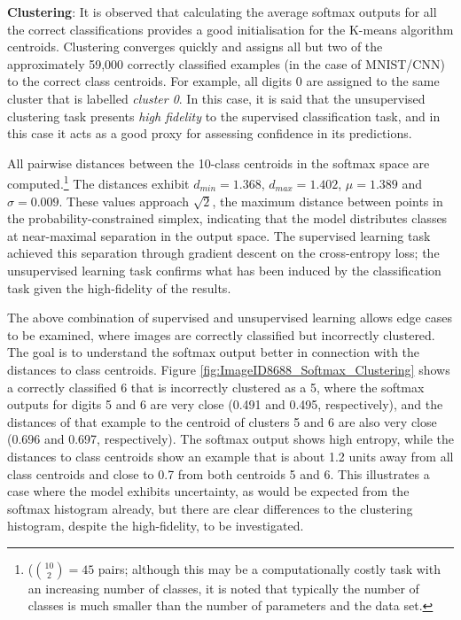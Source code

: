 \textbf{Clustering}: It is observed that calculating the average softmax outputs for all the correct classifications provides a good initialisation for the K-means algorithm centroids. Clustering converges quickly and assigns all but two of the approximately 59,000 correctly classified examples (in the case of MNIST/CNN) to the correct class centroids. For example, all digits 0 are assigned to the same cluster that is labelled \textit{cluster 0}. In this case, it is said that the unsupervised clustering task presents \emph{high fidelity} to the supervised classification task, and in this case it acts as a good proxy for assessing confidence in its predictions.%

All pairwise distances between the 10-class centroids in the softmax space are computed.\footnote{($\binom{10}{2}=45$ pairs; although this may be a computationally costly task with an increasing number of classes, it is noted that typically the number of classes is much smaller than the number of parameters and the data set.} The distances exhibit $d_{min}=1.368$, $d_{max}=1.402$, $\mu=1.389$ and $\sigma=0.009$. These values approach $\sqrt{2}$, the maximum distance between points in the probability-constrained simplex, indicating that the model distributes classes at near-maximal separation in the output space. The supervised learning task achieved this separation through gradient descent on the cross-entropy loss; the unsupervised learning task confirms what has been induced by the classification task given the high-fidelity of the results.

The above combination of supervised and unsupervised learning allows edge cases to be examined, where images are correctly classified but incorrectly clustered. The goal is to understand the softmax output better in connection with the distances to class centroids. Figure \ref{fig:ImageID8688_Softmax_Clustering} shows a correctly classified 6 that is incorrectly clustered as a 5, where the softmax outputs for digits 5 and 6 are very close (0.491 and 0.495, respectively), and the distances of that example to the centroid of clusters 5 and 6 are also very close (0.696 and 0.697, respectively). %
The softmax output shows high entropy, while the distances to class centroids show an example that is about 1.2 units away from all class centroids and close to 0.7 from both centroids 5 and 6. This illustrates a case where the model exhibits uncertainty, as would be expected from the softmax histogram already, but there are clear differences to the clustering histogram, despite the high-fidelity, to be investigated.

